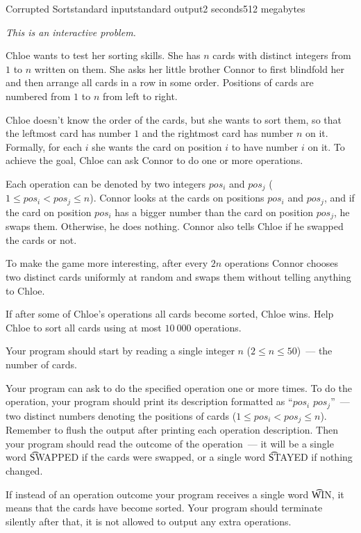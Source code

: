\begin{problem}{Corrupted Sort}{standard input}{standard output}{2 seconds}{512 megabytes}

{\it This is an interactive problem.}

Chloe wants to test her sorting skills. She has $n$ cards with distinct integers from $1$ to $n$ written on them. She asks her little brother Connor to first blindfold her and then arrange all cards in a row in some order. Positions of cards are numbered from $1$ to $n$ from left to right.

Chloe doesn't know the order of the cards, but she wants to sort them, so that the leftmost card has number $1$ and the rightmost card has number $n$ on it. Formally, for each $i$ she wants the card on position $i$ to have number $i$ on it. To achieve the goal, Chloe can ask Connor to do one or more operations.

Each operation can be denoted by two integers $pos_i$ and $pos_j$ ($1 \le pos_i < pos_j \le n$). Connor looks at the cards on positions $pos_i$ and $pos_j$, and if the card on position $pos_i$ has a bigger number than the card on position $pos_j$, he swaps them. Otherwise, he does nothing. Connor also tells Chloe if he swapped the cards or not.

To make the game more interesting, after every $2n$ operations Connor chooses two distinct cards uniformly at random and swaps them without telling anything to Chloe.

If after some of Chloe's operations all cards become sorted, Chloe wins. Help Chloe to sort all cards using at most $10\ 000$ operations.

\Interaction
Your program should start by reading a single integer $n$ ($2 \le n \le 50$)~--- the number of cards. 

Your program can ask to do the specified operation one or more times. To do the operation, your program should print its description formatted as ``\t{$pos_i$ $pos_j$}''~--- two distinct numbers denoting the positions of cards ($1 \le pos_i < pos_j \le n$). Remember to flush the output after printing each operation description. Then your program should read the outcome of the operation~--- it will be a single word \t{SWAPPED} if the cards were swapped, or a single word \t{STAYED} if nothing changed. 

If instead of an operation outcome your program receives a single word \t{WIN}, it means that the cards have become sorted. Your program should terminate silently after that, it is not allowed to output any extra operations.


\end{problem}
